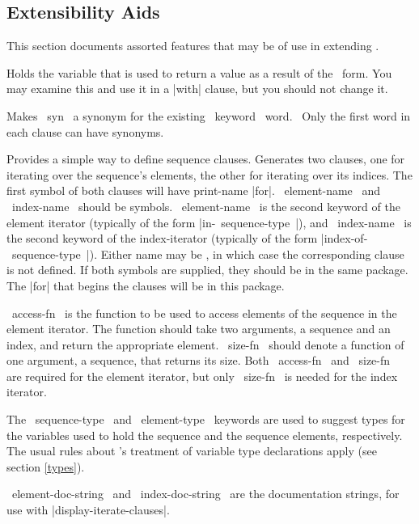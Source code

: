 \subsection{Extensibility Aids}
\label{aids}

This section documents assorted features that may be of use in
extending \iter.

\begin{clauses}

Holds the variable that is used to return a value as a result of the
\iter\ form.  You may examine this and use it in a |with| clause, but
you should not change it.

 Makes ~syn~ a synonym for the existing \iter\ keyword ~word.~  Only
the first word in each clause can have synonyms.

Provides
a simple way to define sequence clauses.  Generates two
clauses, one for iterating over the sequence's elements, the other
for iterating over its indices.  The first symbol of both
clauses will have print-name |for|.
~element-name~  and ~index-name~ should be symbols.
~element-name~ is the second keyword of the element iterator (typically of
the form
|in-~sequence-type~|), and ~index-name~ is the second keyword
of the index-iterator (typically of the form
|index-of-~sequence-type~|).  Either name may be
\nil, in which case the corresponding clause is not defined.  If both
symbols are supplied, they should be in the same package.  The |for|
that begins the clauses will be in this package.

\cpar ~access-fn~ is the function to be used to
access elements of the sequence in the element iterator.  The function
should take two
arguments, a sequence and an index, and return the appropriate element.
~size-fn~ should denote a function of one argument, a sequence, that
returns its size.  Both ~access-fn~ and ~size-fn~ are required for the
element iterator, but only ~size-fn~ is needed for the index iterator.

\cpar The ~sequence-type~ and ~element-type~ keywords are used to
suggest types for the variables
used to hold the sequence and the
sequence elements, respectively.  The usual rules about \iter's
treatment of variable type declarations apply (see section \ref{types}).

\cpar ~element-doc-string~ and ~index-doc-string~ are
the documentation strings, for use with |display-iterate-clauses|.


\end{clauses}
